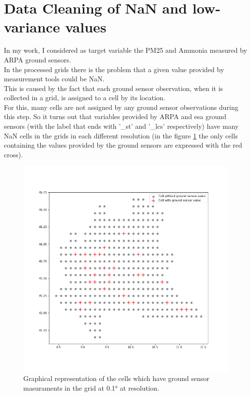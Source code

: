 \section{Data Cleaning of NaN and low-variance values }
\label{subsec:nan}
In my work, I considered as target variable the PM25 and Ammonia measured by ARPA ground sensors.\\
In the processed grids there is the problem that a given value provided by measurement tools could be NaN. \\
This is caused by the fact that each ground sensor observation, when it is collected in a grid, is assigned to a cell by its location. \\
For this, many cells are not assigned by any ground sensor observations during this step.
So it turns out that variables provided by ARPA and \acrshort{esa} ground sensors (with the label that ends with '\_st' and '\_lcs' respectively) have many NaN cells in the grids in each different resolution (in the figure \ref{fig:knn-interpolated} the only cells containing the values provided by the ground sensors are expressed with the red cross).
\begin{figure}[H] 
\centering
\includegraphics[scale=0.4]{images/cell_with_sensors.png}
  \caption{Graphical representation of the cells which have ground sensor masuraments in the grid at 0.1° at resolution.}
 \label{fig:knn-interpolated}
\end{figure}
